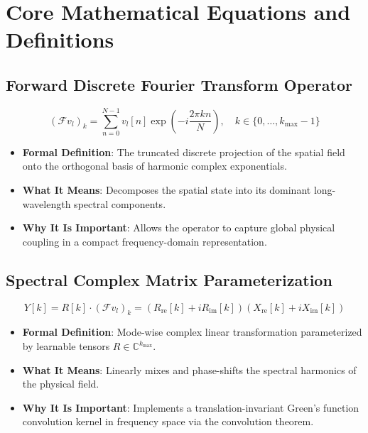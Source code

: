 \documentclass[11pt,a4paper]{article}
\theoremstyle{definition}
\begin{document}
\section{Core Mathematical Equations and Definitions}

\subsection{Forward Discrete Fourier Transform Operator}
{\boldmath
\begin{equation}
(\mathcal{F} v_l)_k = \sum_{n=0}^{N-1} v_l[n] \exp\left( -i \frac{2\pi k n}{N} \right), \quad k \in \{0, \dots, k_{\max}-1\}
\end{equation}
}
\begin{itemize}
    \item \textbf{Formal Definition}: The truncated discrete projection of the spatial field onto the orthogonal basis of harmonic complex exponentials.
    \item \textbf{What It Means}: Decomposes the spatial state into its dominant long-wavelength spectral components.
    \item \textbf{Why It Is Important}: Allows the operator to capture global physical coupling in a compact frequency-domain representation.
\end{itemize}

\subsection{Spectral Complex Matrix Parameterization}
{\boldmath
\begin{equation}
Y[k] = R[k] \cdot (\mathcal{F} v_l)_k = (R_{\text{re}}[k] + i R_{\text{im}}[k]) (X_{\text{re}}[k] + i X_{\text{im}}[k])
\end{equation}
}
\begin{itemize}
    \item \textbf{Formal Definition}: Mode-wise complex linear transformation parameterized by learnable tensors $R \in \mathbb{C}^{k_{\max}}$.
    \item \textbf{What It Means}: Linearly mixes and phase-shifts the spectral harmonics of the physical field.
    \item \textbf{Why It Is Important}: Implements a translation-invariant Green's function convolution kernel in frequency space via the convolution theorem.
\end{itemize}
\end{document}
